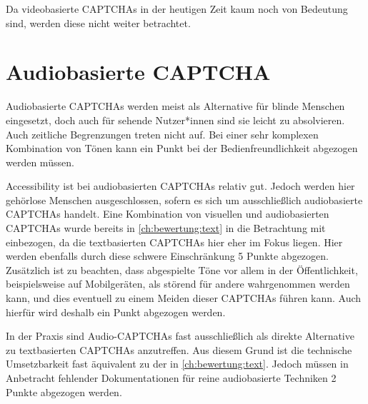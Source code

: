 Da videobasierte CAPTCHAs in der heutigen Zeit kaum noch von Bedeutung sind, werden diese nicht weiter betrachtet.

\section{Audiobasierte CAPTCHA}
\label{ch:bewertung:audio}
Audiobasierte CAPTCHAs werden meist als Alternative für blinde Menschen eingesetzt, 
doch auch für sehende Nutzer*innen sind sie leicht zu absolvieren.
Auch zeitliche Begrenzungen treten nicht auf.
Bei einer sehr komplexen Kombination von Tönen kann ein Punkt bei der Bedienfreundlichkeit abgezogen werden müssen.

Accessibility ist bei audiobasierten CAPTCHAs relativ gut. 
Jedoch werden hier gehörlose Menschen ausgeschlossen, sofern es sich um ausschließlich audiobasierte CAPTCHAs handelt.
Eine Kombination von visuellen und audiobasierten CAPTCHAs wurde bereits in \autoref{ch:bewertung:text} in die Betrachtung mit einbezogen,
da die textbasierten CAPTCHAs hier eher im Fokus liegen.
Hier werden ebenfalls durch diese schwere Einschränkung 5 Punkte abgezogen.
Zusätzlich ist zu beachten, dass abgespielte Töne vor allem in der Öffentlichkeit, beispielsweise auf Mobilgeräten, als störend für andere wahrgenommen werden kann,
und dies eventuell zu einem Meiden dieser CAPTCHAs führen kann.
Auch hierfür wird deshalb ein Punkt abgezogen werden. 

In der Praxis sind Audio-CAPTCHAs fast ausschließlich als direkte Alternative zu textbasierten CAPTCHAs anzutreffen.
Aus diesem Grund ist die technische Umsetzbarkeit fast äquivalent zu der in \autoref{ch:bewertung:text}.
Jedoch müssen in Anbetracht fehlender Dokumentationen für reine audiobasierte Techniken 2 Punkte abgezogen werden.

